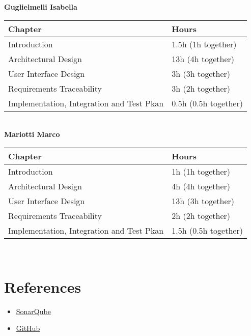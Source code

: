 \documentclass[a4paper, 11pt, titlepage]{article}
\begin{document}
\textbf{Guglielmelli Isabella}

\begin{tabular}{|l|l|} 
    \hline
    \textbf{Chapter}            & \textbf{Hours}  \\ 
    \hline
    Introduction                & 1.5h (1h together)             \\ 
    \hline
    Architectural Design         & 13h (4h together)          \\ 
    \hline
    User Interface Design       & 3h (3h together)              \\ 
    \hline
    Requirements Traceability & 3h (2h together)               \\ 
    \hline
    Implementation, Integration and Test Pkan & 0.5h (0.5h together)               \\ 
    \hline
\end{tabular}\\

\textbf{Mariotti Marco}

\begin{tabular}{|l|l|} 
  \hline
  \textbf{Chapter}            & \textbf{Hours}  \\ 
  \hline
  Introduction                & 1h (1h together)             \\ 
  \hline
  Architectural Design         & 4h (4h together)          \\ 
  \hline
  User Interface Design       & 13h (3h together)              \\ 
  \hline
  Requirements Traceability & 2h (2h together)               \\ 
  \hline
  Implementation, Integration and Test Pkan & 1.5h (0.5h together)               \\ 
  \hline
\end{tabular}\\


\section{References}
\begin{itemize}
  \item \href{https://www.sonarsource.com/products/sonarqube/}{SonarQube}
  \item \href{https://github.com/}{GitHub}
\end{itemize}
\end{document}
